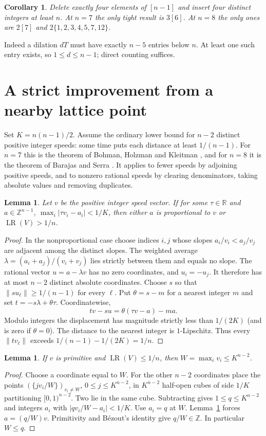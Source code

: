 \documentclass[11pt,a4paper]{article}
\newtheorem{lemma}[theorem]{Lemma}
\newtheorem{corollary}[theorem]{Corollary}
\newcommand{\LR}{\operatorname{LR}}
\newcommand{\nn}[1]{\lVert #1\rVert}
\begin{document}
\begin{corollary}\label{four}
Delete exactly four elements of $[n-1]$ and insert four distinct integers
at least $n$. At $n=7$ the only tight result is $3[6]$. At $n=8$ the only
ones are $2[7]$ and $2\{1,2,3,4,5,7,12\}$.
\end{corollary}
Indeed a dilation $dT$ must have exactly $n-5$ entries below $n$.
At least one such entry exists, so $1\le d\le n-1$; direct counting suffices.

\newpage
\section{A strict improvement from a nearby lattice point}
Set $K=n(n-1)/2$. Assume the ordinary lower bound for $n-2$ distinct
positive integer speeds: some time puts each distance at least $1/(n-1)$.
For $n=7$ this is the theorem of Bohman, Holzman and Kleitman \cite{BHK},
and for $n=8$ it is the theorem of Barajas and Serra \cite{BS}.
It applies to fewer speeds by adjoining positive speeds, and to nonzero
rational speeds by clearing denominators, taking absolute values and
removing duplicates.

\begin{lemma}\label{near}
Let $v$ be the positive integer speed vector. If for some $\tau\in\mathbb R$
and $a\in\mathbb Z^{n-1}$,
$\max_i|\tau v_i-a_i|<1/K$, then either $a$ is proportional to $v$
or $\LR(V)>1/n$.
\end{lemma}
\begin{proof}
In the nonproportional case choose indices $i,j$ whose slopes
$a_i/v_i<a_j/v_j$ are adjacent among the distinct slopes. The weighted
average $\lambda=(a_i+a_j)/(v_i+v_j)$ lies strictly between them and equals
no slope. The rational vector $u=a-\lambda v$ has no zero coordinates,
and $u_i=-u_j$. It therefore has at most $n-2$ distinct absolute
coordinates. Choose $s$ so that $\nn{s u_\ell}\ge1/(n-1)$ for every $\ell$.
Put $\theta=s-m$ for a nearest integer $m$ and set
$t=-s\lambda+\theta\tau$. Coordinatewise,
\[
 tv-su=\theta(\tau v-a)-ma .
\]
Modulo integers the displacement has magnitude strictly less than
$1/(2K)$ (and is zero if $\theta=0$). The distance to the nearest integer
is $1$-Lipschitz. Thus every $\nn{tv_\ell}$ exceeds
$1/(n-1)-1/(2K)=1/n$.
\end{proof}

\begin{lemma}\label{bounded}
If $v$ is primitive and $\LR(V)\le1/n$, then
$W=\max_i v_i\le K^{n-2}$.
\end{lemma}
\begin{proof}
Choose a coordinate equal to $W$. For the other $n-2$ coordinates place the
points $(\{jv_i/W\})_{v_i\ne W}$, $0\le j\le K^{n-2}$, in $K^{n-2}$
half-open cubes of side $1/K$ partitioning $[0,1)^{n-2}$. Two lie in the
same cube. Subtracting gives $1\le q\le K^{n-2}$ and integers $a_i$ with
$|qv_i/W-a_i|<1/K$. Use $a_i=q$ at $W$. Lemma~\ref{near} forces
$a=(q/W)v$. Primitivity and B\'ezout's identity give $q/W\in\mathbb Z$.
In particular $W\le q$.
\end{proof}
\end{document}
